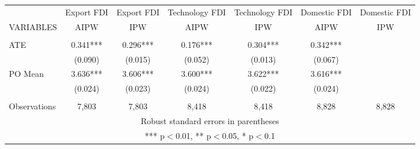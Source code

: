\documentclass[]{article}
\begin{document}
\begin{tabular}{lcccccc} \hline
 & Export FDI  &Export FDI & Technology FDI &Technology FDI & Domestic FDI & Domestic FDI \\
VARIABLES & AIPW & IPW & AIPW & IPW & AIPW & IPW  \\ \hline
 &  &  &  &  &  &  \\
ATE  & 0.341*** &   0.296*** &   0.176*** &   0.304*** &   0.342***   \\
 & (0.090) &   (0.015) &   (0.052) &   (0.013) &   (0.067)   \\
PO Mean &   3.636***   & 3.606***   & 3.600***   & 3.622*** &   3.616*** \\
 &   (0.024) &   (0.023) &   (0.024) &   (0.022) &   (0.024) \\
 &  &  &  &  &  & \\
 Observations & 7,803  & 7,803&  8,418 & 8,418  &  8,828  & 8,828 \\ \hline
\multicolumn{7}{c}{ Robust standard errors in parentheses} \\
\multicolumn{7}{c}{ *** p$<$0.01, ** p$<$0.05, * p$<$0.1} \\
\end{tabular}
\end{document}
